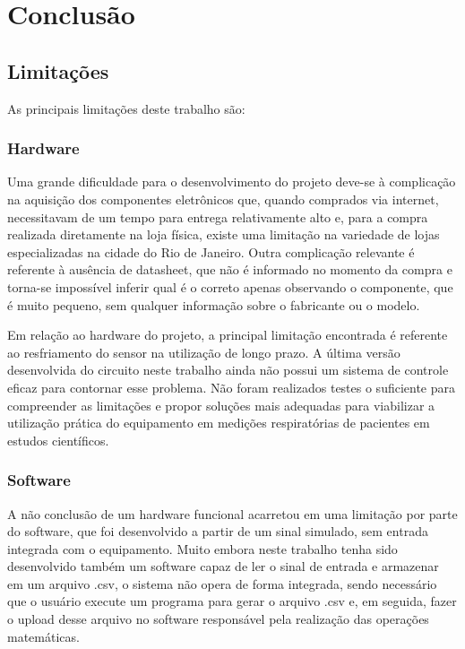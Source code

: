   \chapter{Conclusão}
  
  \section{Limitações}
  
  As principais limitações deste trabalho são:
  
  \subsection{Hardware}
  
  Uma grande dificuldade para o desenvolvimento do projeto deve-se à complicação na aquisição dos componentes eletrônicos que, quando comprados via internet, necessitavam de um tempo para entrega relativamente alto e, para a compra realizada diretamente na loja física, existe uma limitação na variedade de lojas especializadas na cidade do Rio de Janeiro. Outra complicação relevante é referente à ausência de datasheet, que não é informado no momento da compra e torna-se impossível inferir qual é o correto apenas observando o componente, que é muito pequeno, sem qualquer informação sobre o fabricante ou o modelo.
  
  Em relação ao hardware do projeto, a principal limitação encontrada é referente ao resfriamento do sensor na utilização de longo prazo. A última versão desenvolvida do circuito neste trabalho ainda não possui um sistema de controle eficaz para contornar esse problema. Não foram realizados testes o suficiente para compreender as limitações e propor soluções mais adequadas para viabilizar a utilização prática do equipamento em medições respiratórias de pacientes em estudos científicos.
  
  \subsection{Software}
  
  A não conclusão de um hardware funcional acarretou em uma limitação por parte do software, que foi desenvolvido a partir de um sinal simulado, sem entrada integrada com o equipamento. Muito embora neste trabalho tenha sido desenvolvido também um software capaz de ler o sinal de entrada e armazenar em um arquivo .csv, o sistema não opera de forma integrada, sendo necessário que o usuário execute um programa para gerar o arquivo .csv e, em seguida, fazer o upload desse arquivo no software responsável pela realização das operações matemáticas. 

